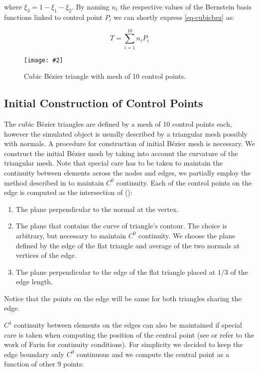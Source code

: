 \documentclass{egpubl}
\newcommand{\Figure}[3]{%
\begin{figure}[htb]
  \centering
  \texttt{[image: \#2]}
  \caption{\label{fig-#2}#3}
\end{figure}}
\newcommand{\CD}[1]{{\color{magenta}{\textbf{C: #1}}}}
\begin{document}
\noindent
where $ \xi_3 = 1 - \xi_1 - \xi_2 $. By naming $n_i$ the respective values
of the Bernstein basis functions linked to control point $P_i$ we can
shortly express \eqref{eq-cubicbez} as:

\begin{equation}\label{eq-cubicbez2}
    T = \sum_{i=1}^{10} n_i P_i
\end{equation}

\Figure{0.8\linewidth}{bezier}
{Cubic B\'ezier triangle with mesh of 10 control points.}


\subsection{Initial Construction of Control Points} %

The cubic B\'ezier triangles are defined by a mesh of 10 control points each, however the
simulated object is usually described by a triangular mesh possibly with normals.
A procedure for construction of initial Bézier mesh is necessary.
We construct the initial B\'ezier mesh by taking into account the curvature of the triangular
mesh. Note that special care has to be taken to maintain
the continuity between elements across the nodes and edges, 
we partially employ the method described in \cite{Ubach2010} to maintain
$C^0$ continuity. Each of the control points on the edge is
computed as the intersection of (\CD{Need to do a figure of this}):

\begin{enumerate}
    \item The plane perpendicular to the normal at the vertex.
    \item The plane that contains the curve of triangle's contour. The
        choice is arbitrary, but necessary to maintain $C^0$ continuity. 
        We choose the plane defined by the edge of the flat triangle and
        average of the two normals at vertices of the edge. 
    \item The plane perpendicular to the edge of the flat triangle placed at
        $1/3$ of the edge length.
\end{enumerate}

Notice that the points on the edge will be same for both triangles sharing
the edge.

$C^1$ continuity between elements on the edges can also be maintained if special care is taken
when computing the position of the central point
(see \cite{Ubach2010} or refer to the work of Farin \cite{Farin2002} for continuity conditions). 
For simplicity we decided to keep the edge boundary only $C^0$ continuous and we compute the central point as a function of other 9 points: 
\end{document}
